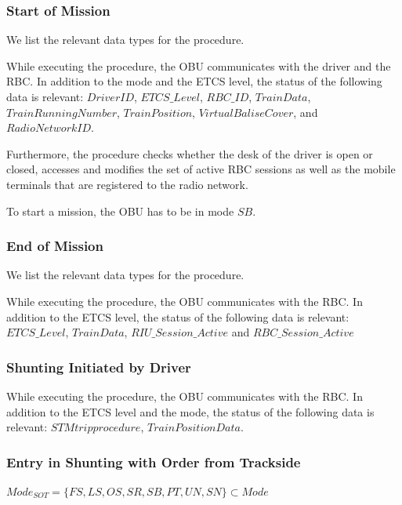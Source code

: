\documentclass{template/openetcs_article}
\begin{document}
 

  

\subsubsection{Start of Mission}

We list the relevant data types for the procedure. 

While executing the procedure, the OBU communicates with the driver and the RBC. In addition to the mode and the ETCS level, the status of the following data is relevant: $\mathit{DriverID}$, $\mathit{ETCS\_Level}$, $\mathit{RBC\_ID}$, $\mathit{TrainData}$, $\mathit{TrainRunningNumber}$, $\mathit{TrainPosition}$, $\mathit{VirtualBaliseCover}$, and $\mathit{RadioNetworkID}$.

Furthermore, the procedure checks whether the desk of the driver is open or closed, accesses and modifies the set of active RBC sessions as well as the mobile terminals that are registered to the radio network.

To start a mission, the OBU has to be in mode $\mathit{SB}$.

\subsubsection{End of Mission}

We list the relevant data types for the procedure. 

While executing the procedure, the OBU communicates with the RBC. In addition to the ETCS level, the status of the following data is relevant: $\mathit{ETCS\_Level}$, $\mathit{TrainData}$, $\mathit{RIU\_Session\_Active}$ and $\mathit{RBC\_Session\_Active}$

\subsubsection{Shunting Initiated by Driver}

While executing the procedure, the OBU communicates with the RBC. In addition to the ETCS level and the mode, the status of the following data is relevant: $\mathit{STM trip procedure}$, $\mathit{TrainPositionData}$.

\subsubsection{Entry in Shunting with Order from Trackside}

$\mathit{Mode}_{\mathit{SOT}} = \{FS, LS, OS, SR, SB, PT, UN, SN\} \subset\mathit{Mode}$
\end{document}
